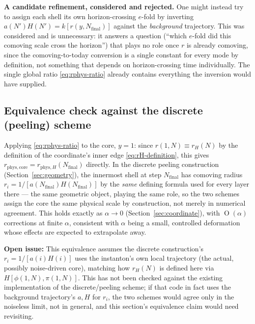 \documentclass[a4paper,11pt]{article}
\DeclareMathOperator{\Or}{O}
\newenvironment{panel}{\begin{tcolorbox}[enhanced,breakable,colback=gray!10,colframe=gray!30]\small}{\end{tcolorbox}}
\newenvironment{todo}{\begin{tcolorbox}[enhanced,breakable,colback=SussexBurntOrange!10,colframe=SussexBurntOrange!40]\small{\textsf{\textbf{Open issue:} }}}{\end{tcolorbox}}
\newcommand{\Ny}{N}                          %
\newcommand{\Nfinal}{N_{\mathrm{final}}}     %
\newcommand{\Hub}{H}                         %
\newcommand{\field}{\phi}                    %
\newcommand{\mom}{\pi}                       %
\newcommand{\rad}{r}                         %
\newcommand{\yco}{y}                         %
\newcommand{\rH}{\rad_H}                     %
\begin{document}
\begin{panel}
\textbf{A candidate refinement, considered and rejected.} One might
instead try to assign each shell its own horizon-crossing $e$-fold by
inverting $a(\Ny')\Hub(\Ny')=k[\rad(\yco,\Nfinal)]$ against the
\emph{background} trajectory. This was considered and is unnecessary: it
answers a question (``which $e$-fold did this comoving scale cross the
horizon'') that plays no role once $\rad$ is already comoving, since the
comoving-to-today conversion is a single constant for every mode by
definition, not something that depends on horizon-crossing time
individually. The single global ratio \eqref{eq:rphys-ratio} already
contains everything the inversion would have supplied.
\end{panel}

\subsection{Equivalence check against the discrete (peeling) scheme}

Applying \eqref{eq:rphys-ratio} to the core, $\yco=1$: since
$\rad(1,\Ny)\equiv\rH(\Ny)$ by the definition of the coordinate's inner
edge \eqref{eq:rH-definition}, this gives
$\rad_{\mathrm{phys,core}} = \rad_{\mathrm{phys},H}(\Nfinal)$ directly. In the discrete
peeling construction (Section~\ref{sec:geometry}), the innermost shell at
step $\Nfinal$ has comoving radius $\rad_i=1/[a(\Nfinal)\Hub(\Nfinal)]$ by
the \emph{same} defining formula used for every layer there --- the same
geometric object, playing the same role, so the two schemes assign the
core the same physical scale by construction, not merely in numerical
agreement. This holds exactly as $\alpha\to0$ (Section~\ref{sec:coordinate}),
with $\Or(\alpha)$ corrections at finite $\alpha$, consistent with $\alpha$
being a small, controlled deformation whose effects are expected to
extrapolate away.

\begin{todo}
This equivalence assumes the discrete construction's $\rad_i=1/[a(i)\Hub(i)]$
uses the instanton's own local trajectory (the actual, possibly
noise-driven core), matching how $\rH(\Ny)$ is defined here via
$\Hub[\field(1,\Ny),\mom(1,\Ny)]$. This has not been checked against the
existing implementation of the discrete/peeling scheme; if that code in
fact uses the background trajectory's $a,\Hub$ for $\rad_i$, the two
schemes would agree only in the noiseless limit, not in general, and this
section's equivalence claim would need revisiting.
\end{todo}
\end{document}
